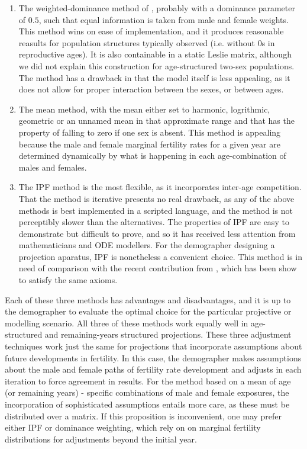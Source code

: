 \begin{enumerate}
\item The weighted-dominance method of \citet{goodman1967age}, probably with
a dominance parameter of $0.5$, such that equal information is taken from male and female
weights. This method wins on ease of implementation, and it produces reasonable
reasults for population structures typically observed (i.e. without 0s in
reproductive ages). It is also containable in a static Leslie matrix, although
we did not explain this construction for age-structured two-sex populations. The
method has a drawback in that the model itself is less appealing, as it does 
not allow for proper interaction between the sexes, or between ages.

\item The mean method, with the mean either set to harmonic, logrithmic,
geometric or an unnamed mean in that approximate range and that has the property
of falling to zero if one sex is absent. This method is appealing because the
male and female marginal fertility rates for a given year are determined
dynamically by what is happening in each age-combination of males and females.

\item The IPF method is the most flexible, as it incorporates inter-age
competition. That the method is iterative presents no real drawback, as any of
the above methods is best implemented in a scripted language, and the method is
not perceptibly slower than the alternatives. The properties of IPF are easy to
demonstrate but difficult to prove, and so it has received less attention from
mathematicians and ODE modellers. For the demographer designing a projection
aparatus, IPF is nonetheless a convenient choice. This method is in need of
comparison with the recent contribution from \citet{choo2006estimating}, which
has been show to satisfy the same axioms.
\end{enumerate}

Each of these three methods has advantages and disadvantages, and it is up to
the demographer to evaluate the optimal choice for the particular projective or
modelling scenario. All three of these methods work equally well in
age-structured and remaining-years structured projections. These three
adjustment techniques work just the same for projections that incorporate
assumptions about future developments in fertility. In this case, the
demographer makes assumptions about the male and female paths of fertility rate development and adjusts in each
iteration to force agreement in results. For the method based on a mean of age
(or remaining years) - specific combinations of male and female exposures, the
incorporation of sophisticated assumptions entails more care, as these must be
distributed over a matrix. If this proposition is inconvenient, one may prefer
either IPF or dominance weighting, which rely on on marginal fertility
distributions for adjustments beyond the initial year.




